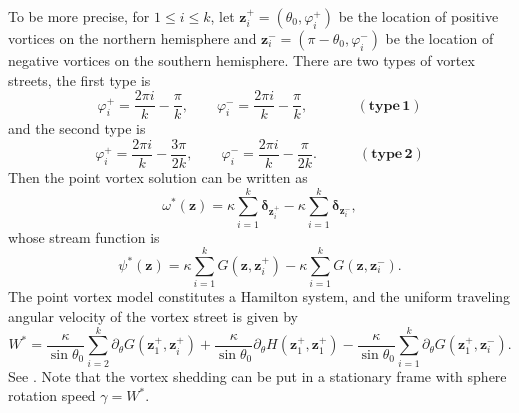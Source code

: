 \documentclass[12pt,reqno]{amsart}
\numberwithin{equation}{section}
\theoremstyle{definition}
\theoremstyle{remark}
\begin{document}
    To be more precise, for $1\le i\le k$, let $\boldsymbol z_i^+=(\theta_0,\varphi_i^+)$ be the location of positive vortices on the northern hemisphere and $\boldsymbol z_i^-=(\pi-\theta_0,\varphi_i^-)$ be the location of negative vortices on the southern hemisphere. There are two types of vortex streets, the first type is 
    $$\varphi_i^+=\frac{2\pi i}{k}-\frac{\pi}{k}, \quad \quad \varphi_i^-=\frac{2\pi i}{k}-\frac{\pi}{k},\quad\quad\quad\ \ \mathbf{(type\, 1)} $$
    and the second type is
    $$\varphi_i^+=\frac{2\pi i}{k}-\frac{3\pi}{2k}, \quad \quad \varphi_i^-=\frac{2\pi i}{k}-\frac{\pi}{2k}.\quad\quad\quad \mathbf{(type\, 2)} $$
    Then the point vortex solution can be written as
    $$\omega^*(\boldsymbol z)=\kappa\sum\limits_{i=1}^{k}\boldsymbol \delta_{\boldsymbol z_i^+}-\kappa\sum\limits_{i=1}^{k}\boldsymbol \delta_{\boldsymbol z_i^-},$$
    whose stream function is 
    $$\psi^*(\boldsymbol z)=\kappa\sum\limits_{i=1}^{k}G(\boldsymbol z,\boldsymbol z_i^+)-\kappa\sum\limits_{i=1}^{k}G(\boldsymbol z,\boldsymbol z_i^-).$$    
    The point vortex model constitutes a Hamilton system, and the uniform traveling angular velocity of the vortex street is given by
    \begin{equation*}
    	W^*=\frac{\kappa}{\sin\theta_0}\sum\limits_{i=2}^k\partial_\theta G(\boldsymbol z_1^+,\boldsymbol z_i^+)+\frac{\kappa}{\sin\theta_0}\partial_\theta H(\boldsymbol z_1^+,\boldsymbol z_1^+)-\frac{\kappa}{\sin\theta_0}\sum\limits_{i=1}^k\partial_\theta G(\boldsymbol z_1^+,\boldsymbol z_i^-).
    \end{equation*}  
    See \cite{Drit}. Note that the vortex shedding can be put in a stationary frame with sphere rotation speed $\gamma=W^*$.
    
\end{document}
